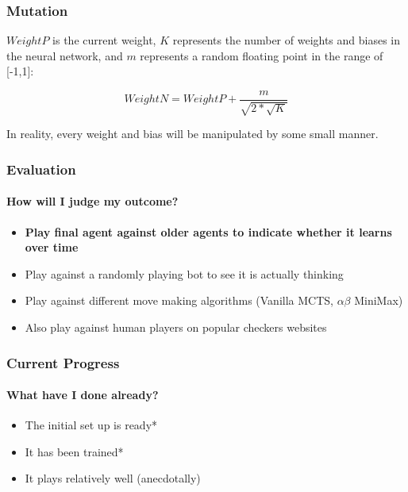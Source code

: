 \documentclass[aspectratio=169]{beamer}
\begin{document}
	\begin{frame}
		\frametitle{Mutation}
		$WeightP$ is the current weight, $K$ represents the number of weights and biases in the neural network, and $m$ represents a random floating point in the range of [-1,1]:

			$$ WeightN = WeightP + \frac{m}{\sqrt{2 * \sqrt{K} }}$$


		In reality, every weight and bias will be manipulated by some small manner.
		
	\end{frame}


\begin{frame}
	\frametitle{Evaluation}
	\framesubtitle{How will I judge my outcome?}

	\begin{itemize}
		\item {\bf Play final agent against older agents to indicate whether it learns over time}
		\item Play against a randomly playing bot to see it is actually thinking
		\item Play against different move making algorithms (Vanilla MCTS, $\alpha \beta$ MiniMax)
		\item Also play against human players on popular checkers websites
	\end{itemize}
\end{frame}

\begin{frame}
	\frametitle{Current Progress}
	\framesubtitle{What have I done already?}

	\begin{itemize}
		\item The initial set up is ready*
		\item It has been trained*
		\item It plays relatively well (anecdotally)
	\end{itemize}
\end{frame}
\end{document}
